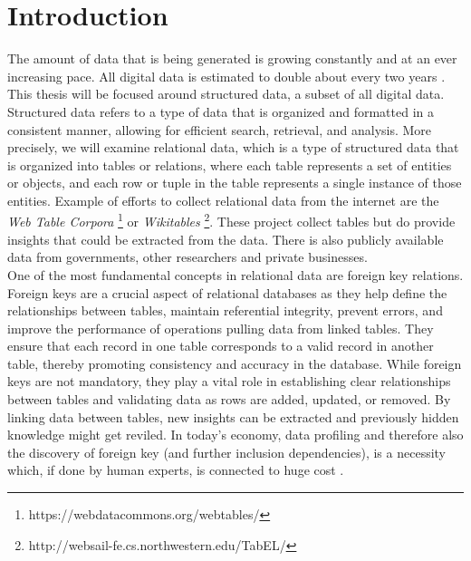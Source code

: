 \section{Introduction}
The amount of data that is being generated is growing constantly and at an ever increasing pace. All digital data is estimated to double about every two years \cite{gantz2012digital}. This thesis will be focused around structured data, a subset of all digital data. Structured data refers to a type of data that is organized and formatted in a consistent manner, allowing for efficient search, retrieval, and analysis. More precisely, we will examine relational data, which is a type of structured data that is organized into tables or relations, where each table represents a set of entities or objects, and each row or tuple in the table represents a single instance of those entities. Example of efforts to collect relational data from the internet are the \textit{Web Table Corpora} \footnote{https://webdatacommons.org/webtables/} or \textit{Wikitables} \footnote{http://websail-fe.cs.northwestern.edu/TabEL/}. These project collect tables but do provide insights that could be extracted from the data. There is also publicly available data from governments, other researchers and private businesses.\\

One of the most fundamental concepts in relational data are foreign key relations\cite{casanova1982inclusion}. Foreign keys are a crucial aspect of relational databases as they help define the relationships between tables, maintain referential integrity, prevent errors, and improve the performance of operations pulling data from linked tables. They ensure that each record in one table corresponds to a valid record in another table, thereby promoting consistency and accuracy in the database. While foreign keys are not mandatory, they play a vital role in establishing clear relationships between tables and validating data as rows are added, updated, or removed. By linking data between tables, new insights can be extracted and previously hidden knowledge might get reviled. In today's economy, data profiling and therefore also the discovery of foreign key (and further inclusion dependencies), is a necessity which, if done by human experts, is connected to huge cost \cite{halevy2006data}.\\

